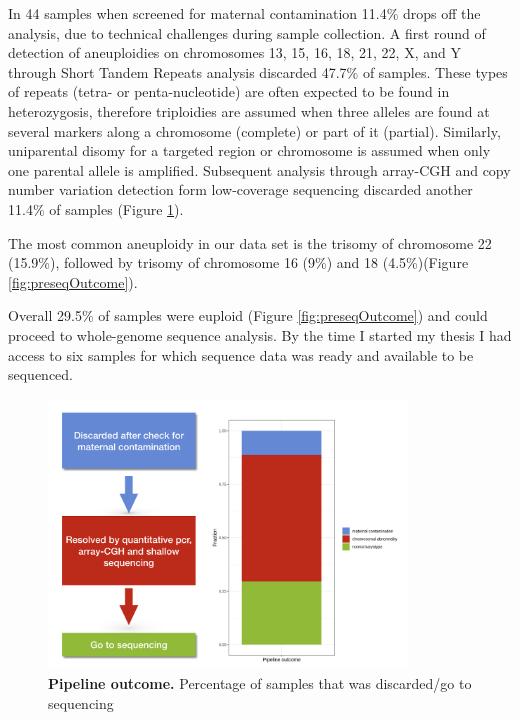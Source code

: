 \documentclass[
tikz,
11pt, %
oneside, %
english, %
singlespacing, %
headsepline, %
]{MastersDoctoralThesisV2} %
\begin{document}
In 44 samples when screened for maternal contamination 11.4\% drops off the analysis, due to technical challenges during sample collection. A first round of detection of aneuploidies on chromosomes 13, 15, 16, 18, 21, 22, X, and Y through Short Tandem Repeats analysis discarded 47.7\% of samples. These types of repeats (tetra- or penta-nucleotide) are often expected to be found in heterozygosis, therefore triploidies are assumed when three alleles are found at several markers along a chromosome (complete) or part of it (partial). Similarly, uniparental disomy for a targeted region or chromosome is assumed when only one parental allele is amplified. Subsequent analysis through array-CGH and \gls{copy number variation} detection form low-coverage sequencing discarded another 11.4\% of samples (Figure \ref{fig:pipelineOutcome}).

The most common aneuploidy in our data set is the trisomy of chromosome 22 (15.9\%), followed by trisomy of chromosome 16 (9\%) and 18 (4.5\%)(Figure \ref{fig:preseqOutcome}).


Overall 29.5\% of samples were euploid (Figure \ref{fig:preseqOutcome}) and could proceed to whole-genome sequence analysis. By the time I started my thesis I had access to six samples for which sequence data was ready and available to be sequenced. 


\begin{figure}[H]
\centering
\includegraphics[width=0.85\textwidth]{fig/sampletocollectG.png}
\decoRule
\caption{\textbf{Pipeline outcome.} Percentage of samples that was discarded/go to sequencing }
\label{fig:pipelineOutcome}
\end{figure}
\end{document}
